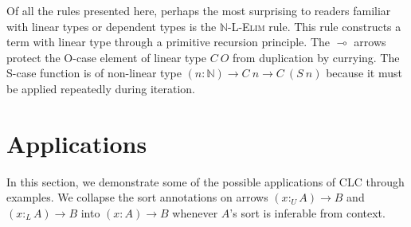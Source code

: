 \documentclass[sigplan,screen,review,authordraft]{acmart}
\theoremstyle{definition}
\newcommand{\rname}[1]{\textsc{\footnotesize #1}}
\newcommand{\utype}{:_{\scriptscriptstyle U}}
\newcommand{\ltype}{:_{\scriptscriptstyle L}}
\begin{document}
  Of all the rules presented here, perhaps the most surprising to readers familiar with linear types or dependent types is the \rname{$\mathbb{N}$-L-Elim} rule. This rule constructs a term with linear type through a primitive recursion principle. The $\multimap$ arrows protect the O-case element of linear type $C\ O$ from duplication by currying. The S-case function is of non-linear type $(n : \mathbb{N}) \rightarrow C\ n \rightarrow C\ (S\ n)$ because it must be applied repeatedly during iteration.
  
  \section{Applications}
  In this section, we demonstrate some of the possible applications of CLC through examples. We collapse the sort annotations on arrows $(x \utype A) \rightarrow B$ and $(x \ltype A) \rightarrow B$ into $(x : A) \rightarrow B$ whenever $A$'s sort is inferable from context.
\end{document}
